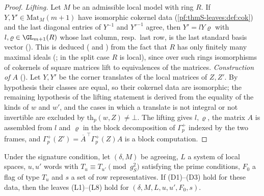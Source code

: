 \begin{proof}
\emph{Lifting.} Let $M$ be an admissible local model with ring $R$. If $Y,Y'\in\mathrm{Mat}_M(m+1)$ have isomorphic cokernel data (\cref{pf:thmS-leaves:def:cok})
and the last diagonal entries of $Y^{-1}$ and $Y'^{-1}$ agree, then $Y'=lY\varrho$ with $l,\varrho\in\GL_{m+1}(R)$ whose last column, resp.\ last row, is the
last standard basis vector (). This is deduced
( and )
from the fact that $R$ has only finitely many maximal ideals (; in the split case $R$ is local), since
over such rings isomorphisms of cokernels of square matrices lift to equivalences of the matrices.
\emph{Construction of $A$} (). Let $Y,Y'$ be the corner
translates of the local matrices of $Z,Z'$. By hypothesis their classes are equal, so their cokernel data are isomorphic; the remaining
hypothesis of the lifting statement is derived from the equality of the kinds of $w$ and $w'$, and the cases in which a translate is not
integral or not invertible are excluded by $\mathrm{th}_p(w,Z)\ne\bot$. The lifting gives $l,\varrho$, the matrix $A$ is assembled from $l$ and $\varrho$ in
the block decomposition of $\Gamma^+_p$ indexed by the two frames, and $\Gamma^+_p(Z')=\overline A^{\,\top}\Gamma^+_p(Z)A$ is a block computation.
\end{proof}
\begin{theorem}\label{pf:thmS-leaves:thm:leaves}
Under the signature condition, let $(\delta,M)$ be agreeing, $L$ a system of local spaces, $u,u'$ words with
$T_u\equiv T_{u'}\pmod{g_S^2}$ satisfying the prime conditions, $F_0$ a flag of type $T_u$ and $s$ a set of row
representatives. If (D1)--(D3) hold for these data, then the leaves (L1)--(L8) hold for $(\delta,M,L,u,u',F_0,s)$.
\end{theorem}

